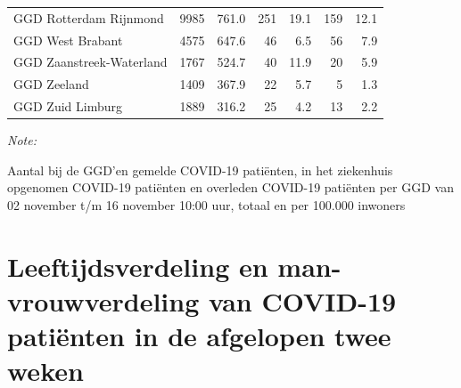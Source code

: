 \documentclass[
  english,
  man,floatsintext]{apa6}
\begin{document}
\begin{table}[H]
\begin{threeparttable}
\begin{tabular}{lrrrrrr}
GGD Rotterdam Rijnmond & 9985 & 761.0 & 251 & 19.1 & 159 & 12.1\\
GGD West Brabant & 4575 & 647.6 & 46 & 6.5 & 56 & 7.9\\
GGD Zaanstreek-Waterland & 1767 & 524.7 & 40 & 11.9 & 20 & 5.9\\
GGD Zeeland & 1409 & 367.9 & 22 & 5.7 & 5 & 1.3\\
GGD Zuid Limburg & 1889 & 316.2 & 25 & 4.2 & 13 & 2.2\\
\bottomrule
\end{tabular}
\begin{tablenotes}
\item \textit{Note: } 
\item Aantal bij de GGD’en gemelde COVID-19 patiënten, in het ziekenhuis opgenomen COVID-19 patiënten en overleden COVID-19 patiënten per GGD van 02 november t/m 16 november 10:00 uur, totaal en per 100.000 inwoners
\end{tablenotes}
\end{threeparttable}
\endgroup{}
\end{table}

\newpage

\hypertarget{leeftijdsverdeling-en-man-vrouwverdeling-van-covid-19-patiuxebnten-in-de-afgelopen-twee-weken}{%
\section{Leeftijdsverdeling en man-vrouwverdeling van COVID-19 patiënten in de afgelopen twee weken}\label{leeftijdsverdeling-en-man-vrouwverdeling-van-covid-19-patiuxebnten-in-de-afgelopen-twee-weken}}
\end{document}
